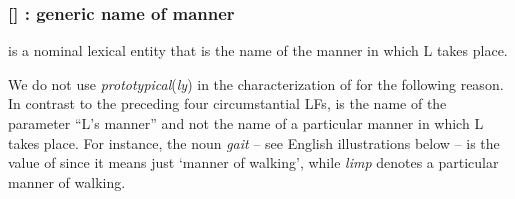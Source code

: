 \subsubsection*{{\small []}  : generic name of manner}\label{lf:S-mod}

 is a nominal lexical entity that is the name of the manner in which L takes place.

We do not use \textit{prototypical}(\textit{ly}) in the characterization of  for the following reason. In contrast to the preceding four circumstantial LFs,  is the name of the parameter ``L's manner'' and not the name of a particular manner in which L takes place. For instance, the noun \textit{gait} -- see English illustrations below -- is the value of  since it means just `manner of walking', while \textit{limp} denotes a particular manner of walking.

